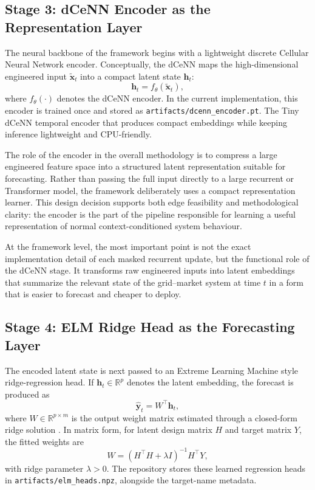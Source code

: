 \subsection{Stage 3: dCeNN Encoder as the Representation Layer}

The neural backbone of the framework begins with a lightweight discrete Cellular Neural Network encoder. Conceptually, the dCeNN maps the high-dimensional engineered input $\tilde{\mathbf{x}}_t$ into a compact latent state $\mathbf{h}_t$:
\begin{equation}
	\mathbf{h}_t = f_{\theta}\!\left(\tilde{\mathbf{x}}_t\right),
	\label{eq:framework_encoder}
\end{equation}
where $f_{\theta}(\cdot)$ denotes the dCeNN encoder. In the current implementation, this encoder is trained once and stored as \texttt{artifacts/dcenn\_encoder.pt}. The Tiny dCeNN temporal encoder that produces compact embeddings while keeping inference lightweight and CPU-friendly.

The role of the encoder in the overall methodology is to compress a large engineered feature space into a structured latent representation suitable for forecasting. Rather than passing the full input directly to a large recurrent or Transformer model, the framework deliberately uses a compact representation learner. This design decision supports both edge feasibility and methodological clarity: the encoder is the part of the pipeline responsible for learning a useful representation of normal context-conditioned system behaviour.

At the framework level, the most important point is not the exact implementation detail of each masked recurrent update, but the functional role of the dCeNN stage. It transforms raw engineered inputs into latent embeddings that summarize the relevant state of the grid--market system at time $t$ in a form that is easier to forecast and cheaper to deploy.

\subsection{Stage 4: ELM Ridge Head as the Forecasting Layer}

The encoded latent state is next passed to an Extreme Learning Machine style ridge-regression head. If $\mathbf{h}_t \in \mathbb{R}^{p}$ denotes the latent embedding, the forecast is produced as
\begin{equation}
	\hat{\mathbf{y}}_t = W^{\top}\mathbf{h}_t,
	\label{eq:framework_elm}
\end{equation}
where $W \in \mathbb{R}^{p \times m}$ is the output weight matrix estimated through a closed-form ridge solution \cite{huang2006extreme,hoerl1970ridge}. In matrix form, for latent design matrix $H$ and target matrix $Y$, the fitted weights are
\begin{equation}
	W = \left(H^{\top}H + \lambda I\right)^{-1}H^{\top}Y,
	\label{eq:framework_ridge}
\end{equation}
with ridge parameter $\lambda > 0$. The repository stores these learned regression heads in \texttt{artifacts/elm\_heads.npz}, alongside the target-name metadata.

